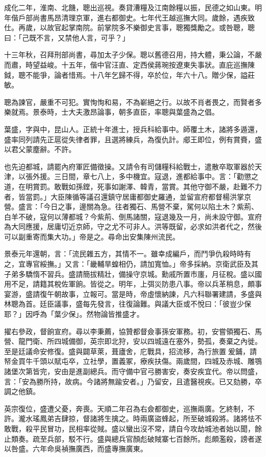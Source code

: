 \begin{pinyinscope}
成化二年，淮南、北饑，聰出巡視。奏貸漕糧及江南餘糧以振，民德之如山東。明年偕戶部尚書馬昂清理京軍，進右都御史。七年代王越巡撫大同。歲餘，遇疾致仕。再歲，以故官起掌南院。前掌院多不樂御史言事，聰獨獎勵之。或咎聰，聰曰：「己既不言，又禁他人言，可乎？」

十三年秋，召拜刑部尚書，尋加太子少保。聰以舊德召用，持大體，秉公論，不嚴而肅，時望益峻。十五年，偕中官汪直、定西侯蔣琬按遼東失事狀。直庇巡撫陳鉞，聰不能爭，論者惜焉。十八年乞歸不得，卒於位，年六十八。贈少保，謚莊敏。

聰為諫官，嚴重不可犯。實恂恂和易，不為嶄絕之行。以故不肖者畏之，而賢者多樂就焉。景泰時，士大夫激昂論事，朝多直臣，率聰與葉盛為之倡。

葉盛，字與中，昆山人。正統十年進士，授兵科給事中。師覆土木，諸將多遁還，盛率同列請先正扈從失律者罪，且選將練兵，為復仇計。郕王即位，例有賞賚，盛以君父蒙塵辭。不許。

也先迫都城，請罷內府軍匠備徵操。又請令有司儲糧科給戰士，遣散卒取軍器於天津，以張外援。三日間，章七八上，多中機宜。寇退，進都給事中。言：「勸懲之道，在明賞罰。敢戰如孫鏜，死事如謝澤、韓青，當賞。其他守御不嚴，赴難不力者，皆當罰。」大臣陳循等議召還鎮守居庸都御史羅通，並留宣府都督楊洪掌京營。盛言：「今日之事，邊關為急。往者獨石、馬營不棄，駕何以陷土木？紫荊、白羊不破，寇何以薄都城？今紫荊、倒馬諸關，寇退幾及一月，尚未設守御。宣府為大同應援，居庸切近京師，守之尤不可非人。洪等既留，必求如洪者代之，然後可以副重寄而集大功。」帝是之。尋命出安集陳州流民。

景泰元年還朝，言：「流民雜五方，其情不一。雖幸成編戶，而鬥爭仇殺時時有之，宜專官綏撫。」又言：「畿輔旱蝗相仍，請加寬恤。」帝多採納。京衛武臣及其子弟多驕惰不習兵。盛請簡拔精壯，備操守京城。勳戚所置市廛，月征稅。盛以國用不足，請籍其稅佐軍餉。皆從之。明年，上弭災防患八事。帝以兵革稍息，頗事宴游，盛請復午朝故事，立報可。當是時，帝虛懷納諫，凡六科聯署建請，多盛與林聰為首。廷臣議事，盛每先發言，往復論難。與議大臣或不悅曰：「彼豈少保耶？」因呼為「葉少保」。然物論皆推盛才。

擢右參政，督餉宣府。尋以李秉薦，協贊都督僉事孫安軍務。初，安嘗領獨石、馬營、龍門衛、所四城備御，英宗即北狩，安以四城遠在塞外，勢孤，奏棄之內徙。至是廷議命安修復。盛與闢草萊，葺廬舍，庀戰具，招流移，為行旅置爰鋪，請帑金買牛千頭以賦屯卒，立社學，置義冢，療疾扶傷。兩歲間，四城及赤城、雕鶚諸堡次第皆完，安由是進副總兵。而守備中官弓勝害安，奏安疾宜代。帝以問盛，言：「安為勝所持，故病。今諸將無踰安者。」乃留安，且遣醫視疾。已又劾勝，卒調之他鎮。

英宗復位，盛遭父憂，奔喪。天順二年召為右僉都御史，巡撫兩廣。乞終制，不許。瀧水瑤鳳弟吉肆掠，督諸將生擒之。時兩廣盜蜂起，所至破城殺將。諸將怯不敢戰，殺平民冒功，民相率從賊。盛以蠻出沒不常，請自今攻劫城池者始以聞，餘止類奏。疏至兵部，駁不行。盛與總兵官顏彪破賊寨七百餘所。彪頗濫殺，謗者遂以咎盛。六年命吳禎撫廣西，而盛專撫廣東。


\end{pinyinscope}
